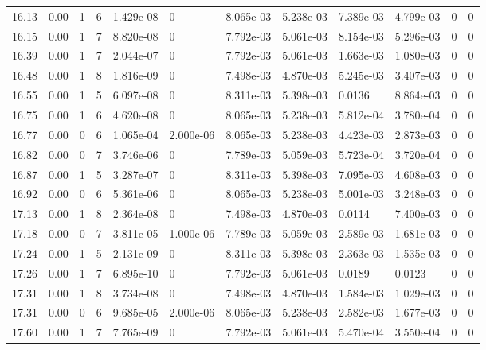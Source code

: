 \documentclass[preview]{standalone}
\begin{document}
{{{{{{\begin{tabular}{L{1.2cm}C{1.2cm} C{0.3cm}C{0.5cm} C{1.4cm}C{1.4cm} C{1.4cm}C{1.4cm} C{1.6cm}C{1.6cm} C{1.6cm}C{1.6cm}}
  16.13  &  0.00  & 1     &  6 &  1.429e-08  & 0  &  8.065e-03&   5.238e-03& 7.389e-03 & 4.799e-03   &  0 & 0  \\ 
  16.15  &  0.00  & 1     &  7 &  8.820e-08  & 0  &  7.792e-03&   5.061e-03& 8.154e-03 & 5.296e-03   &  0 & 0  \\ 
  16.39  &  0.00  & 1     &  7 &  2.044e-07  & 0  &  7.792e-03&   5.061e-03& 1.663e-03 & 1.080e-03   &  0 & 0  \\ 
  16.48  &  0.00  & 1     &  8 &  1.816e-09  & 0  &  7.498e-03&   4.870e-03& 5.245e-03 & 3.407e-03   &  0 & 0  \\ 
  16.55  &  0.00  & 1     &  5 &  6.097e-08  & 0  &  8.311e-03&   5.398e-03& 0.0136 & 8.864e-03   &  0 & 0  \\ 
  16.75  &  0.00  & 1     &  6 &  4.620e-08  & 0  &  8.065e-03&   5.238e-03& 5.812e-04 & 3.780e-04   &  0 & 0  \\ 
  16.77  &  0.00  & 0     &  6 &  1.065e-04  & 2.000e-06  &  8.065e-03&   5.238e-03& 4.423e-03 & 2.873e-03   &  0 & 0  \\ 
  16.82  &  0.00  & 0     &  7 &  3.746e-06  & 0  &  7.789e-03&   5.059e-03& 5.723e-04 & 3.720e-04   &  0 & 0  \\ 
  16.87  &  0.00  & 1     &  5 &  3.287e-07  & 0  &  8.311e-03&   5.398e-03& 7.095e-03 & 4.608e-03   &  0 & 0  \\ 
  16.92  &  0.00  & 0     &  6 &  5.361e-06  & 0  &  8.065e-03&   5.238e-03& 5.001e-03 & 3.248e-03   &  0 & 0  \\ 
  17.13  &  0.00  & 1     &  8 &  2.364e-08  & 0  &  7.498e-03&   4.870e-03& 0.0114 & 7.400e-03   &  0 & 0  \\ 
  17.18  &  0.00  & 0     &  7 &  3.811e-05  & 1.000e-06  &  7.789e-03&   5.059e-03& 2.589e-03 & 1.681e-03   &  0 & 0  \\ 
  17.24  &  0.00  & 1     &  5 &  2.131e-09  & 0  &  8.311e-03&   5.398e-03& 2.363e-03 & 1.535e-03   &  0 & 0  \\ 
  17.26  &  0.00  & 1     &  7 &  6.895e-10  & 0  &  7.792e-03&   5.061e-03& 0.0189 & 0.0123   &  0 & 0  \\ 
  17.31  &  0.00  & 1     &  8 &  3.734e-08  & 0  &  7.498e-03&   4.870e-03& 1.584e-03 & 1.029e-03   &  0 & 0  \\ 
  17.31  &  0.00  & 0     &  6 &  9.685e-05  & 2.000e-06  &  8.065e-03&   5.238e-03& 2.582e-03 & 1.677e-03   &  0 & 0  \\ 
  17.60  &  0.00  & 1     &  7 &  7.765e-09  & 0  &  7.792e-03&   5.061e-03& 5.470e-04 & 3.550e-04   &  0 & 0  \\ 

\end{tabular}}}}}}}
\end{document}
